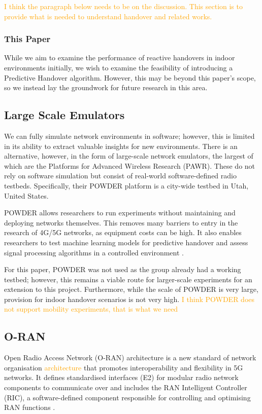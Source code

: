 \textcolor{orange}{I think the paragraph below needs to be on the discussion. This section is to provide what is needed to understand handover and related works. }

\subsubsection*{This Paper} While we aim to examine the performance of reactive handovers in indoor environments initially, we wish to examine the feasibility of introducing a Predictive Handover algorithm. However, this may be beyond this paper's scope, so we instead lay the groundwork for future research in this area. 

\subsection{Large Scale Emulators}
We can fully simulate network environments in software; however, this is limited in its ability to extract valuable insights for new environments. There is an alternative, however, in the form of large-scale network emulators, the largest of which are the Platforms for Advanced Wireless Research (PAWR). These do not rely on software simulation but consist of real-world software-defined radio testbeds. Specifically, their POWDER platform is a city-wide testbed in Utah, United States. 

POWDER allows researchers to run experiments without maintaining and deploying networks themselves. This removes many barriers to entry in the research of 4G/5G networks, as equipment costs can be high. It also enables researchers to test machine learning models for predictive handover and assess signal processing algorithms in a controlled environment \cite{rusca_mobile_2023}.

For this paper, POWDER was not used as the group already had a working testbed; however, this remains a viable route for larger-scale experiments for an extension to this project. Furthermore, while the scale of POWDER is very large, provision for indoor handover scenarios is not very high. \textcolor{orange}{I think POWDER does not support mobility experiments, that is what we need}

\subsection{O-RAN}
Open Radio Access Network (O-RAN) architecture is a new standard of network organisation \textcolor{orange}{architecture} that promotes interoperability and flexibility in 5G networks. It defines standardised interfaces (E2) for modular radio network components to communicate over and includes the RAN Intelligent Controller (RIC), a software-defined component responsible for controlling and optimising RAN functions \citep{juniper_networks_uki_what_2022}. 

